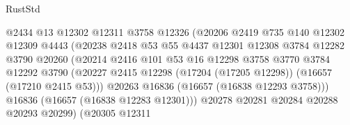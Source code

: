 \begin{lexlean}{RustStd}
\begin{coremodule}
                                      @2434
                                      @13
                                      @12302
                                      @12311
                                      @3758
                                      @12326
                                      (@20206
                                        @2419
                                        @735
                                        @140
                                        @12302
                                        @12309
                                        @4443
                                        (@20238
                                          @2418
                                          @53
                                          @55
                                          @4437
                                          @12301
                                          @12308
                                          @3784
                                          @12282
                                          @3790
                                          @20260
                                          (@20214
                                            @2416
                                            @101
                                            @53
                                            @16
                                            @12298
                                            @3758
                                            @3770
                                            @3784
                                            @12292
                                            @3790
                                            (@20227
                                              @2415
                                              @12298
                                              (@17204 (@17205 @12298))
                                              (@16657 (@17210 @2415 @53)))
                                            @20263
                                            @16836
                                            (@16657 (@16838 @12293 @3758)))
                                          @16836
                                          (@16657 (@16838 @12283 @12301)))
                                        @20278
                                        @20281
                                        @20284
                                        @20288
                                        @20293
                                        @20299)
                                      (@20305
                                        @12311

\end{coremodule}
\end{lexlean}
